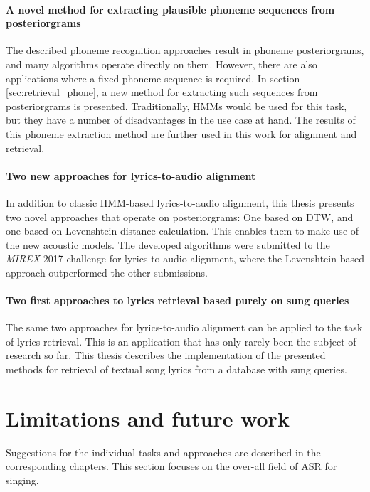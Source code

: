 \paragraph{A novel method for extracting plausible phoneme sequences from posteriorgrams}
The described phoneme recognition approaches result in phoneme posteriorgrams, and many algorithms operate directly on them. However, there are also applications where a fixed phoneme sequence is required. In section \ref{sec:retrieval_phone}, a new method for extracting such sequences from posteriorgrams is presented. Traditionally, HMMs would be used for this task, but they have a number of disadvantages in the use case at hand. The results of this phoneme extraction method are further used in this work for alignment and retrieval.

\paragraph{Two new approaches for lyrics-to-audio alignment}
In addition to classic HMM-based lyrics-to-audio alignment, this thesis presents two novel approaches that operate on posteriorgrams: One based on DTW, and one based on Levenshtein distance calculation. This enables them to make use of the new acoustic models. The developed algorithms were submitted to the \textit{MIREX} 2017 challenge for lyrics-to-audio alignment, where the Levenshtein-based approach outperformed the other submissions.

\paragraph{Two first approaches to lyrics retrieval based purely on sung queries}
The same two approaches for lyrics-to-audio alignment can be applied to the task of lyrics retrieval. This is an application that has only rarely been the subject of research so far. This thesis describes the implementation of the presented methods for retrieval of textual song lyrics from a database with sung queries.


\section{Limitations and future work}

Suggestions for the individual tasks and approaches are described in the corresponding chapters. This section focuses on the over-all field of ASR for singing.\\


